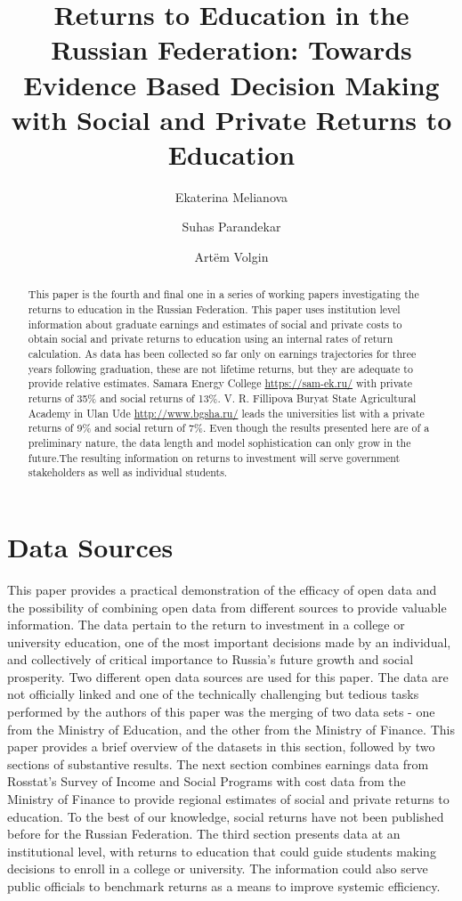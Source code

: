 \documentclass[alpha-refs]{wiley-article-05g}
\title{Returns to Education in the Russian Federation: Towards Evidence Based Decision Making with Social and Private Returns to Education}
\author[*]{Ekaterina Melianova}
\author[*]{\hspace{-1em}Suhas Parandekar}
\author[*]{\hspace{-1em}Art\"{e}m Volgin}
\affil[*]{Education Global Practice, Europe and Central Asia}
\begin{document}
\maketitle

\begin{abstract}
\vspace{.5em}
This paper is the fourth and final one in a series of working papers investigating the returns to education in the Russian Federation. This paper uses institution level information about graduate earnings and estimates of social and private costs to obtain social and private returns to education using an internal rates of return calculation. As data has been collected so far only on earnings trajectories for three years following graduation, these are not lifetime returns, but they are adequate to provide relative estimates. Samara Energy College \url{https://sam-ek.ru/} with private returns of 35\% and social returns of 13\%. V. R. Fillipova Buryat State Agricultural Academy in Ulan Ude \url{http://www.bgsha.ru/} leads the universities list with a private returns of 9\% and social return of 7\%. Even though the results presented here are of a preliminary nature, the data length and model sophistication can only grow in the future.The resulting information on returns to investment will serve government stakeholders as well as individual students.  

\end{abstract}

\section{Data Sources}

This paper provides a practical demonstration of the efficacy of open data 
and the possibility of combining open data from different sources to 
provide valuable information. The data pertain to the return to investment 
in a college or university education, one of the most important decisions 
made by an individual, and collectively of critical importance to Russia's 
future growth and social prosperity. Two different open data sources are 
used for this paper. The data are not officially linked and one of the 
technically challenging but tedious tasks performed by the authors of this 
paper was the merging of two data sets - one from the Ministry of 
Education, and the other from the Ministry of Finance. This paper provides 
a brief overview of the datasets in this section, followed by two sections 
of substantive results. The next section combines earnings data from 
Rosstat's Survey of Income and Social Programs with cost data from the 
Ministry of Finance to provide regional estimates of social and private 
returns to education. To the best of our knowledge, social returns have not 
been published before for the Russian Federation. The third section 
presents data at an institutional level, with returns to education that 
could guide students making decisions to enroll in a college or university. 
The information could also serve public officials to benchmark returns as a 
means to improve systemic efficiency. 
\end{document}
